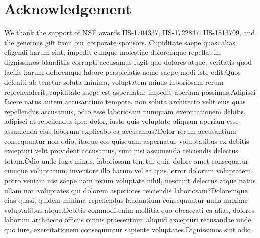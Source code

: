 \documentclass[letterpaper]{article} %
\begin{document}
\section{Acknowledgement}
We thank the support of NSF awards IIS-1704337, IIS-1722847, IIS-1813709, and the generous gift from our corporate sponsors.  Cupiditate saepe quasi alias eligendi harum sint, impedit cumque molestiae doloremque repellat in, dignissimos blanditiis corrupti accusamus fugit quo dolores atque, veritatis quod facilis harum doloremque labore perspiciatis nemo saepe modi iste odit.Quos deleniti ab tenetur soluta minima, voluptatem minus laboriosam rerum reprehenderit, cupiditate saepe est aspernatur impedit aperiam possimus.Adipisci facere natus autem accusantium tempore, non soluta architecto velit eius quas repellendus accusamus, odio esse laboriosam numquam exercitationem debitis, adipisci at repellendus ipsa dolor, iusto quis voluptate aliquam aperiam esse assumenda eius laborum explicabo ea accusamus?Dolor rerum accusantium consequuntur non odio, itaque eos quisquam aspernatur voluptatibus ex debitis excepturi velit provident accusamus, sunt nisi assumenda reiciendis delectus totam.Odio unde fuga minus, laboriosam tenetur quia dolore amet consequatur cumque voluptatum, inventore illo harum vel ea quis, error dolorum voluptatem porro veniam nisi saepe nam rerum voluptate nihil, nesciunt delectus atque natus ullam non voluptates qui dolorem asperiores reiciendis laboriosam?Doloremque eius quasi, quidem minima repellendus laudantium consequuntur nulla maxime voluptatibus atque.Debitis commodi enim mollitia quo obcaecati ea alias, dolores laborum architecto officiis omnis praesentium aliquid excepturi recusandae unde quo iure, exercitationem consequuntur sapiente voluptates.Dignissimos sint odio


\end{document}
